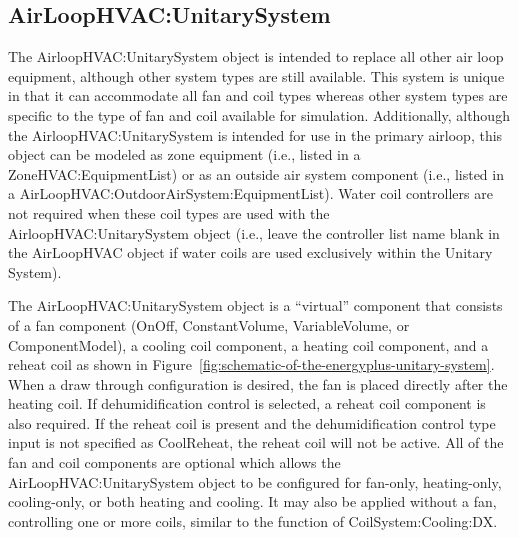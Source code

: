 \subsection{AirLoopHVAC:UnitarySystem}\label{airloophvacunitarysystem}

The AirloopHVAC:UnitarySystem object is intended to replace all other air loop equipment, although other system types are still available. This system is unique in that it can accommodate all fan and coil types whereas other system types are specific to the type of fan and coil available for simulation. Additionally, although the AirloopHVAC:UnitarySystem is intended for use in the primary airloop, this object can be modeled as zone equipment (i.e., listed in a ZoneHVAC:EquipmentList) or as an outside air system component (i.e., listed in a AirLoopHVAC:OutdoorAirSystem:EquipmentList). Water coil controllers are not required when these coil types are used with the AirloopHVAC:UnitarySystem object (i.e., leave the controller list name blank in the AirLoopHVAC object if water coils are used exclusively within the Unitary System).

The AirLoopHVAC:UnitarySystem object is a ``virtual'' component that consists of a fan component (OnOff, ConstantVolume, VariableVolume, or ComponentModel), a cooling coil component, a heating coil component, and a reheat coil as shown in Figure~\ref{fig:schematic-of-the-energyplus-unitary-system}. When a draw through configuration is desired, the fan is placed directly after the heating coil. If dehumidification control is selected, a reheat coil component is also required. If the reheat coil is present and the dehumidification control type input is not specified as CoolReheat, the reheat coil will not be active. All of the fan and coil components are optional which allows the AirLoopHVAC:UnitarySystem object to be configured for fan-only, heating-only, cooling-only, or both heating and cooling. It may also be applied without a fan, controlling one or more coils, similar to the function of CoilSystem:Cooling:DX. 

